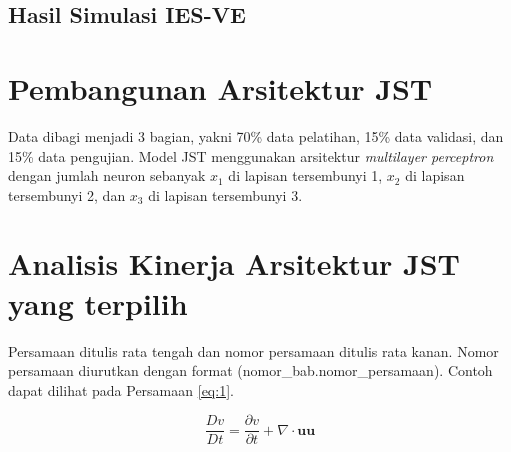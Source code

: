 \subsection{Hasil Simulasi IES-VE}

\section{Pembangunan Arsitektur JST}
Data dibagi menjadi 3 bagian, yakni 70\% data pelatihan, 15\% data validasi, dan 15\% data pengujian. Model JST menggunakan arsitektur \textit{multilayer perceptron} dengan jumlah neuron sebanyak $x_1$ di lapisan tersembunyi 1, $x_2$ di lapisan tersembunyi 2, dan $x_3$ di lapisan tersembunyi 3.

\section{Analisis Kinerja Arsitektur JST yang terpilih}

Persamaan ditulis rata tengah dan nomor persamaan ditulis rata kanan. Nomor persamaan
diurutkan dengan format (nomor\_bab.nomor\_persamaan). Contoh dapat dilihat pada Persamaan \eqref{eq:1}.

\begin{equation}
    \dfrac{Dv}{Dt} = \dfrac{\partial v}{\partial t} + \nabla \cdot \mathbf{uu}
\label{eq:1}
\end{equation}

